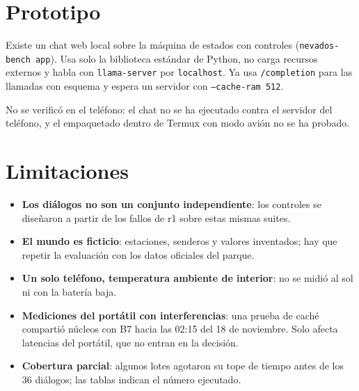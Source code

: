 \documentclass[11pt,a4paper]{article}
\newcommand{\m}[1]{\texttt{#1}}
\begin{document}
\section{Prototipo}

Existe un chat web local sobre la máquina de estados con controles (\m{nevados-bench app}). Usa solo la biblioteca estándar de Python, no carga recursos externos y habla con \m{llama-server} por \m{localhost}. Ya usa \m{/completion} para las llamadas con esquema y espera un servidor con \m{--cache-ram 512}.

No se verificó en el teléfono: el chat no se ha ejecutado contra el servidor del teléfono, y el empaquetado dentro de Termux con modo avión no se ha probado.

\section{Limitaciones}

\begin{itemize}
\item \textbf{Los diálogos no son un conjunto independiente}: los controles se diseñaron a partir de los fallos de r1 sobre estas mismas suites.
\item \textbf{El mundo es ficticio}: estaciones, senderos y valores inventados; hay que repetir la evaluación con los datos oficiales del parque.
\item \textbf{Un solo teléfono, temperatura ambiente de interior}: no se midió al sol ni con la batería baja.
\item \textbf{Mediciones del portátil con interferencias}: una prueba de caché compartió núcleos con B7 hacia las 02:15 del 18 de noviembre. Solo afecta latencias del portátil, que no entran en la decisión.
\item \textbf{Cobertura parcial}: algunos lotes agotaron su tope de tiempo antes de los 36 diálogos; las tablas indican el número ejecutado.
\end{itemize}
\end{document}
